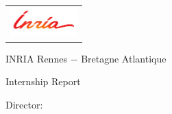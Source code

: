 \newcommand{\HRule}{\rule{\linewidth}{0.2mm}}
%
\thispagestyle{empty}

\begin{center}\leavevmode

\vspace{-2cm}

\begin{tabular}{l}
\includegraphics[width=2.6cm]{images/logo-inria.jpg}
\end{tabular}


{\large \sc INRIA Rennes $-$ Bretagne Atlantique}

\vspace{6.0cm}


{\huge\bf \tituloTesis}

\vspace{2cm}

{\large Internship Report}

\vspace{2cm}

{\Large \autor}

\end{center}

\vfill

{\large

{Director: \director}

\vspace{.2cm}

\vspace{.2cm}

\lugar
}

\newpage\thispagestyle{empty}
